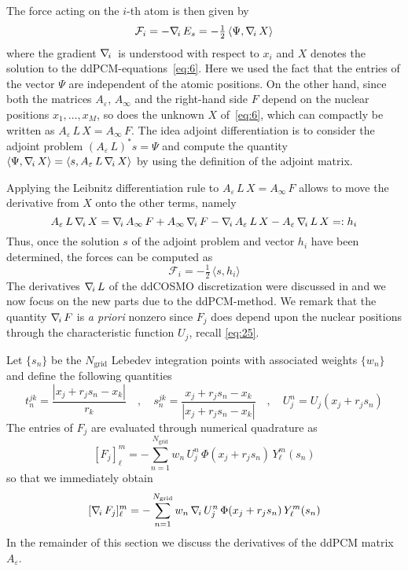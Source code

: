 The force acting on the $i$-th atom is then given by
\[
\mathcal{F}_i = -\nabla_{\!i}\, E_s = - \tfrac{1}{2} 
\,  \langle \Psi, \nabla_{\!i}\, X \rangle 
\]
where the gradient $\nabla_{\!i}\,$ is understood with respect to $x_i$ and $X$ denotes the solution to the ddPCM-equations~\eqref{eq:6}. 
Here we used the fact that the entries of the vector $\Psi$ are independent of the atomic positions. On the other hand, since both the matrices $A_\varepsilon$, $A_\infty$ and the right-hand side $F$ depend on the nuclear positions $x_1 , \ldots, x_M$, so does the unknown $X$ of~\eqref{eq:6}, which can compactly be written as $A_\varepsilon \, L \, X = A_\infty \, F$.
The idea adjoint differentiation is to consider the adjoint problem $(A_\varepsilon \, L)^* s = \Psi$ and compute the quantity $\langle \Psi, \nabla_{\!i}\, X \rangle = \langle s ,  A_\varepsilon \, L \, \nabla_{\!i}\, X\rangle$ by using the definition of the adjoint matrix.

Applying the Leibnitz differentiation rule to $A_\varepsilon \, L \, X = A_\infty \, F$ allows to move the derivative from $X$ onto the other terms, namely
\[
A_\varepsilon \, L \, \nabla_{\!i}\, X = \nabla_{\!i}\, A_\infty \, F +  A_\infty \, \nabla_{\!i}\, F - \nabla_{\!i}\, A_\varepsilon \, L \, X -  A_\varepsilon \, \nabla_{\!i}\, L \, X=: h_i
\]
Thus, once the solution $s$ of the adjoint problem and vector $h_i$ have been determined, the forces can be computed as
\[
\mathcal{F}_i =  - \tfrac{1}{2} 
 \,  \langle s, h_i \rangle
\]
The derivatives $\nabla_{\!i}\, L $ of the ddCOSMO discretization were discussed in \cite{Lipparini_JCTC_ddCOSMO} and we now focus on the new parts due to the ddPCM-method. We remark that the quantity $\nabla_{\!i}\, F$ is \emph{a priori} nonzero since $F_j$ does depend upon the nuclear positions through the characteristic function $U_j$, recall \eqref{eq:25}.

Let $\{ s_n\}$ be the $N_\text{grid}$ Lebedev integration points with associated weights $\{ w_n \}$ and define the following quantities
\[
t_n^{jk} = \frac{|x_j + r_j s_n -x_k|}{r_k} \quad , \quad s_n^{jk} = \frac{x_j + r_j s_n -x_k}{|x_j + r_j s_n -x_k|}\quad , \quad U_j^n = U_j(x_j + r_j s_n)
\]
The entries of $F_j$ are evaluated through numerical quadrature as
\[
[F_j]_\ell^m = - \sum_{n = 1} ^{N_\text{grid}} w_n \, U_j^n \, \Phi(x_j + r_js_n) \, Y_\ell^m(s_n)
\]
so that we immediately obtain
\[
[\nabla_{\!i}\, F_j]_\ell^m = - \sum_{n = 1} ^{N_\text{grid}} w_n \, \nabla_{\!i}\, U_j^n \, \Phi(x_j + r_js_n) \, Y_\ell^m(s_n)
\]
In the remainder of this section we discuss the derivatives of the ddPCM matrix $A_\varepsilon$.

